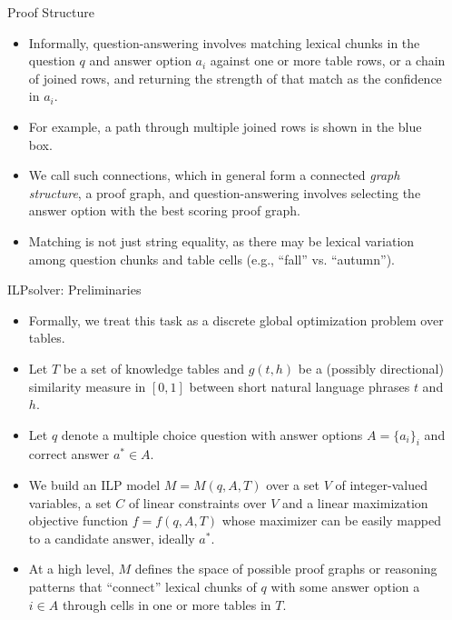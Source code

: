 \documentclass[final]{beamer}
\newlength{\sepwid}
\newlength{\onecolwid}
\newlength{\twocolwid}
\begin{document}
\begin{frame}[t]
\begin{columns}[t]
\begin{column}{\sepwid}\end{column} %

\begin{column}{\twocolwid} %

\begin{columns}[t,totalwidth=\twocolwid] %

\begin{column}{\onecolwid}\vspace{-.6in} %

\begin{block}{Proof Structure}
\begin{itemize}
	\item Informally, question-answering involves matching lexical
	chunks in the question $q$ and answer option $a_i$ against one or
	more table rows, or a chain of joined rows, and returning the
	strength of that match as the confidence in $a_i$. 
	\item For example, a path through multiple joined rows is shown in {\color{blue} the blue box}. 
	\item We call such connections, which in general form
	a connected \textit{graph structure}, a proof graph, and question-answering involves selecting the answer option with the best
	scoring proof graph. 
	\item Matching is not just string equality, as there may be lexical variation among question	chunks and table cells (e.g., ``fall'' vs. ``autumn'').
\end{itemize}
\end{block}

\begin{block}{ILPsolver: Preliminaries}	
\begin{itemize}
	\item Formally, we treat this task as a discrete global optimization problem over tables. 
	\item Let $T$ be a set of knowledge tables and $g(t,h)$ be a (possibly directional) similarity measure in $[0,1]$ between short natural
	language phrases $t$ and $h$. 
	\item  Let $q$ denote a multiple choice	question with answer options $A = \{a_i \}_i$ and correct answer $a^* \in A$. 
	\item We build an ILP model $M = M(q,A,T)$ over a set $V$ of integer-valued variables, a set $C$ of linear constraints over $V$ and a linear maximization objective function $f = f(q,A,T )$ whose maximizer can be easily mapped to a candidate answer, ideally $a^*$. 
	\item At a high level, $M$ defines the space of possible proof graphs or reasoning patterns that ``connect'' lexical chunks of $q$ with some answer option a $i \in A$ through cells in one or more tables in $T$.
\end{itemize}


\end{block}
\end{column}
\end{columns}
\end{column}
\end{columns}
\end{frame}
\end{document}

